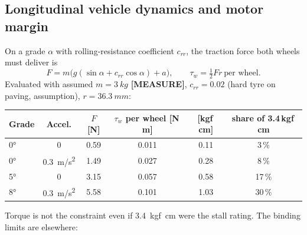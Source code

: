 \documentclass[11pt,a4paper]{article}
\newcommand{\mk}[2]{\textsf{\scriptsize\bfseries\colorbox{#1bg}{\color{#1}[#2]}}}
\newcommand{\MEASURE}{\mk{warn}{MEASURE}}
\begin{document}
\subsection{Longitudinal vehicle dynamics and motor margin}\label{sec:longdyn}

On a grade $\alpha$ with rolling-resistance coefficient $c_{rr}$, the traction
force both wheels must deliver is
\begin{equation}
F = m\bigl(g(\sin\alpha+c_{rr}\cos\alpha)+a\bigr),\qquad
\tau_{w}=\tfrac12 F r\ \text{per wheel}.
\end{equation}
Evaluated with assumed $m=\qty{3}{kg}$ \MEASURE, $c_{rr}=0.02$ (hard tyre on
paving, assumption), $r=\qty{36.3}{mm}$:

\begin{center}
\small
\begin{tabular}{@{}lccccc@{}}
\toprule
\textbf{Grade} & \textbf{Accel.} & \textbf{$F$ [N]} & \textbf{$\tau_w$ per wheel [N\,m]} & \textbf{[kgf\,cm]} & \textbf{share of 3.4\,kgf\,cm}\\
\midrule
\ang{0} & 0 & 0.59 & 0.011 & 0.11 & 3\,\%\\
\ang{0} & \qty{0.3}{m/s^2} & 1.49 & 0.027 & 0.28 & 8\,\%\\
\ang{5} & 0 & 3.15 & 0.057 & 0.58 & 17\,\%\\
\ang{8} & \qty{0.3}{m/s^2} & 5.58 & 0.101 & 1.03 & 30\,\%\\
\bottomrule
\end{tabular}
\end{center}

Torque is not the constraint even if \qty{3.4}{kgf.cm} were the stall rating.
The binding limits are elsewhere:
\end{document}
